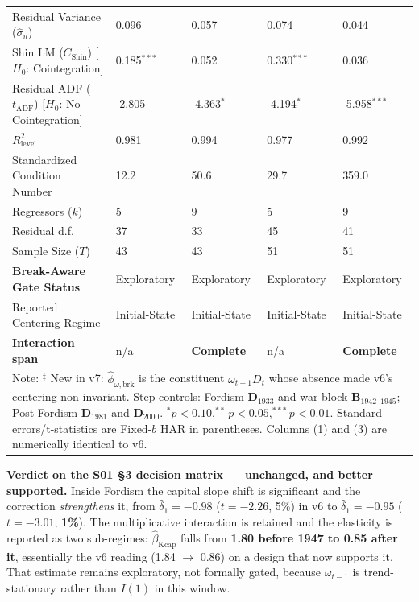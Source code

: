 \documentclass[11pt,a4paper]{article}
\begin{document}
\begin{table}[H]
\begin{tabular}{p{5.5cm}p{2.5cm}p{2.5cm}p{2.5cm}p{2.5cm}}
Residual Variance ($\hat{\sigma}_u$) & 0.096 & 0.057 & 0.074 & 0.044 \\
Shin LM ($C_{\text{Shin}}$) [$H_0$: Cointegration] & 0.185$^{***}$ & 0.052 & 0.330$^{***}$ & 0.036 \\
Residual ADF ($t_{\text{ADF}}$) [$H_0$: No Cointegration] & -2.805 & -4.363$^{*}$ & -4.194$^{*}$ & -5.958$^{***}$ \\
$R^2_{\text{level}}$ & 0.981 & 0.994 & 0.977 & 0.992 \\
Standardized Condition Number & 12.2 & 50.6 & 29.7 & 359.0 \\
Regressors ($k$) & 5 & 9 & 5 & 9 \\
Residual d.f. & 37 & 33 & 45 & 41 \\
Sample Size ($T$) & 43 & 43 & 51 & 51 \\
\textbf{Break-Aware Gate Status} & Exploratory & Exploratory & Exploratory & Exploratory \\
Reported Centering Regime & Initial-State & Initial-State & Initial-State & Initial-State \\
\textbf{Interaction span} & n/a & \textbf{Complete} & n/a & \textbf{Complete} \\
\bottomrule
\multicolumn{5}{p{15.5cm}}{\footnotesize Note: $^{\ddagger}$ New in v7: $\hat{\phi}_{\omega, \text{brk}}$ is the constituent $\omega_{t-1} D_t$ whose absence made v6's centering non-invariant. Step controls: Fordism $\mathbf{D}_{1933}$ and war block $\mathbf{B}_{1942\text{--}1945}$; Post-Fordism $\mathbf{D}_{1981}$ and $\mathbf{D}_{2000}$. $^{*}p<0.10, ^{**}p<0.05, ^{***}p<0.01$. Standard errors/t-statistics are Fixed-$b$ HAR in parentheses. Columns (1) and (3) are numerically identical to v6.}
\end{tabular}
\end{table}

\textbf{Verdict on the S01 \S3 decision matrix --- unchanged, and better supported.} Inside Fordism the capital slope shift is significant and the correction \textit{strengthens} it, from $\hat{\delta}_1 = -0.98$ ($t = -2.26$, 5\%) in v6 to $\hat{\delta}_1 = -0.95$ ($t = -3.01$, \textbf{1\%}). The multiplicative interaction is retained and the elasticity is reported as two sub-regimes: $\hat{\beta}_{\text{Kcap}}$ falls from \textbf{1.80 before 1947 to 0.85 after it}, essentially the v6 reading (1.84 $\to$ 0.86) on a design that now supports it. That estimate remains exploratory, not formally gated, because $\omega_{t-1}$ is trend-stationary rather than $I(1)$ in this window.
\end{document}
